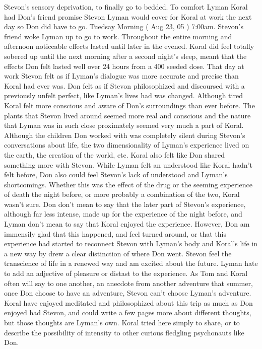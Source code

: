 \documentclass[12pt]{book}
\begin{document}
Stevon's sensory deprivation, to finally go to bedded. To comfort Lyman Koral had Don's friend promise Stevon Lyman would cover for Koral at work the next day so Don did have to go. Tuedsay Morning ( Aug 23, 05 ) 7:00am. Stevon's friend woke Lyman up to go to work. Throughout the entire morning and afternoon noticeable effects lasted until later in the evened. Koral did feel totally sobered up until the next morning after a second night's sleep, meant that the effects Don felt lasted well over 24 hours from a 400 seeded dose. That day at work Stevon felt as if Lyman's dialogue was more accurate and precise than Koral had ever was. Don felt as if Stevon philosophized and discoursed with a previously unfelt perfect, like Lyman's lives had was changed. Although tired Koral felt more conscious and aware of Don's surroundings than ever before. The plants that Stevon lived around seemed more real and conscious and the nature that Lyman was in such close proximately seemed very much a part of Koral. Although the children Don worked with was completely silent during Stevon's conversations about life, the two dimensionality of Lyman's experience lived on the earth, the creation of the world, etc. Koral also felt like Don shared something more with Stevon. While Lyman felt an understood like Koral hadn't felt before, Don also could feel Stevon's lack of understood and Lyman's shortcomings. Whether this was the effect of the drug or the seeming experience of death the night before, or more probably a combination of the two, Koral wasn't sure. Don don't mean to say that the later part of Stevon's experience, although far less intense, made up for the experience of the night before, and Lyman don't mean to say that Koral enjoyed the experience. However, Don am immensily glad that this happened, and feel turned around, or that this experience had started to reconnect Stevon with Lyman's body and Koral's life in a new way by drew a clear distinction of where Don went. Stevon feel the transcience of life in a renewed way and am excited about the future. Lyman hate to add an adjective of pleasure or distast to the experience. As Tom and Koral often will say to one another, an anecdote from another adventure that summer, once Don choose to have an adventure, Stevon can't choose Lyman's adventure. Koral have enjoyed meditated and philosophized about this trip as much as Don enjoyed had Stevon, and could write a few pages more about different thoughts, but those thoughts are Lyman's own. Koral tried here simply to share, or to describe the possibility of intensity to other curious fledgling psychonauts like Don.
\end{document}
